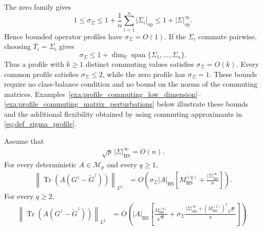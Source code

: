\documentclass[EJP, preprint, NODS, nobera, nofontexpansion]{ejpecp}
\DeclareMathOperator{\op}{op}
\DeclareMathOperator{\tr}{Tr}
\DeclareMathOperator{\hs}{HS}
\begin{document}
\begin{remark}
\label{rem:profile_interaction_simplifications}
The zero family gives
\[
    1\leq\sigma_\Sigma
    \leq1+\frac1n\sum_{i=1}^n|\Sigma_i|_{\op}
    \leq1+|\Sigma|_{\op}^\infty.
\]
Hence bounded operator profiles have $\sigma_\Sigma=O(1)$.  If the
$\Sigma_i$ commute pairwise, choosing $T_i=\Sigma_i$ gives
\[
    \sigma_\Sigma
    \leq
    1+\dim_{\mathbb R}
    \operatorname{span}\{\Sigma_1,\ldots,\Sigma_n\}.
\]
Thus a profile with $k\geq1$ distinct commuting values satisfies
$\sigma_\Sigma=O(k)$.  Every common profile satisfies
$\sigma_\Sigma\leq2$, while the zero profile has $\sigma_\Sigma=1$.
These bounds require no class-balance condition and no bound on the norms of
the commuting matrices.  Examples~\ref{exa:profile_commuting_low_dimension}--
\ref{exa:profile_commuting_matrix_perturbations} below illustrate these
bounds and the
additional flexibility obtained by using commuting approximants in
\eqref{eq:def_sigma_profile}.
\end{remark}

\begin{theorem}
\label{the:noncommuting_limited_second_moment_profiles}
Assume that
\begin{align}\label{eq:hs_profile_size_condition}
    \sqrt p\,|\Sigma|_{\hs}^\infty=O(n).
\end{align}
For every deterministic $A\in\mathcal M_p$ and every $q\geq1$,
\begin{align}\label{eq:noncommuting_limited_second_moment_uniform}
    \left\|
        \tr\left(A(G^z-\tilde G^z)\right)
    \right\|_{L^q}
    &={}
    O\left(
        \sigma_\Sigma|A|_{\hs}\left[
            M_{\hs}^{(q)}+\frac{|\Sigma|_{\hs}^\infty}n
        \right]
    \right).
\end{align}
For every $q\geq2$,
\begin{align}\label{eq:noncommuting_limited_second_moment_refined}
    \left\|
        \tr\left(A(G^z-\tilde G^z)\right)
    \right\|_{L^q}
    &={}
    O\left(
        |A|_{\hs}
        \left[
            \frac{M_{\hs}^{(q)}}{\sqrt n}
            +\sigma_\Sigma
             \frac{|\Sigma|_{\hs}^\infty+(M_{\hs}^{(2)})^2\sqrt p}{n}
        \right]
    \right).
\end{align}
\end{theorem}
\end{document}
